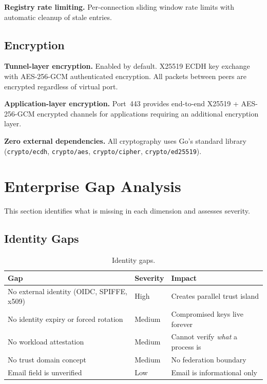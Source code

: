 \documentclass[11pt,a4paper]{article}
\begin{document}
\textbf{Registry rate limiting.} Per-connection sliding window rate limits with automatic cleanup of stale entries.

\subsection{Encryption}

\textbf{Tunnel-layer encryption.} Enabled by default. X25519 ECDH key exchange with AES-256-GCM authenticated encryption. All packets between peers are encrypted regardless of virtual port.

\textbf{Application-layer encryption.} Port~443 provides end-to-end X25519 + AES-256-GCM encrypted channels for applications requiring an additional encryption layer.

\textbf{Zero external dependencies.} All cryptography uses Go's standard library (\texttt{crypto/ecdh}, \texttt{crypto/aes}, \texttt{crypto/cipher}, \texttt{crypto/ed25519}).

\section{Enterprise Gap Analysis}

This section identifies what is missing in each dimension and assesses severity.

\subsection{Identity Gaps}

\begin{table}[h]
\centering
\begin{tabular}{@{}lll@{}}
\toprule
\textbf{Gap} & \textbf{Severity} & \textbf{Impact} \\
\midrule
No external identity (OIDC, SPIFFE, x509) & High & Creates parallel trust island \\
No identity expiry or forced rotation & Medium & Compromised keys live forever \\
No workload attestation & Medium & Cannot verify \emph{what} a process is \\
No trust domain concept & Medium & No federation boundary \\
Email field is unverified & Low & Email is informational only \\
\bottomrule
\end{tabular}
\caption{Identity gaps.}
\end{table}
\end{document}
